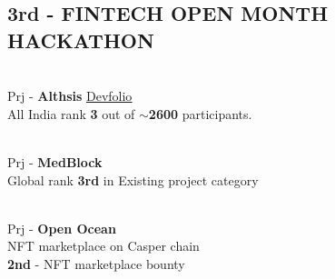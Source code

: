\documentclass[]{deedy-resume-openfont}
\begin{document}
\begin{minipage}[t]{0.37\textwidth}
{    \subsection{3rd -  FINTECH OPEN MONTH \\HACKATHON \hspace{0.05cm} \faLink}
}
\\
Prj - \textbf{Althsis} 
\space \href{https://github.com/code-squads/Althsis}{\faGithub}
\space \href{https://devfolio.co/projects/althsis-30ca}{\underline{Devfolio}} \\
All India rank \textbf{3} out of \textbf{$\sim$2600} participants.
\sectionsep
\vspace{0.05cm}


 \\
Prj - \textbf{MedBlock} 
\space \href{https://github.com/code-squads/medblock}{\faGithub} \\
Global rank \textbf{3rd} in Existing project category
\sectionsep
\vspace{0.05cm}

 \\
Prj - \textbf{Open Ocean}
\space \href{https://github.com/OmkarPh/nftmarketplace}{\faGithub} \\
NFT marketplace on Casper chain \\
\textbf{2nd} - NFT marketplace bounty
\sectionsep

%
%

\end{minipage} 
\hfill
\end{document}
